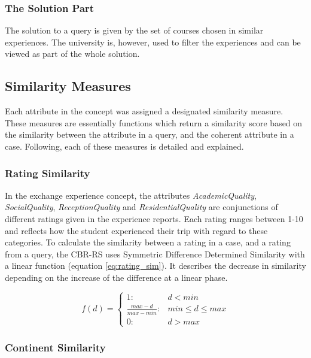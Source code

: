 \subsubsection{The Solution Part}
The solution to a query is given by the set of courses chosen in similar experiences. The university is, however, used to filter the experiences and can be viewed as part of the whole solution. 

\subsection{Similarity Measures}
Each attribute in the concept was assigned a designated similarity measure. These measures are essentially functions which return a similarity score based on the similarity between the attribute in a query, and the coherent attribute in a case. Following, each of these measures is detailed and explained.


\subsubsection{Rating Similarity} 

In the exchange experience concept, the attributes \emph{AcademicQuality}, \emph{SocialQuality}, \emph{ReceptionQuality} and \emph{ResidentialQuality} are conjunctions of different ratings given in the experience reports. Each rating ranges between 1-10 and reflects how the student experienced their trip with regard to these categories. To calculate the similarity between a rating in a case, and a rating from a query, the CBR-RS uses Symmetric Difference Determined Similarity \cite{bergmann2002experience} with a linear function (equation \ref{eq:rating_sim}). It describes the decrease in similarity depending on the increase of the difference at a linear phase.


\begin{equation} \label{eq:rating_sim}
    f(d) = 
    \begin{cases} 1 : & d < min \\ 
    \frac{max-d}{max-min} : & min \leq d \leq max \\
    0 : & d > max
    \end{cases}
\end{equation}


\subsubsection{Continent Similarity} 

